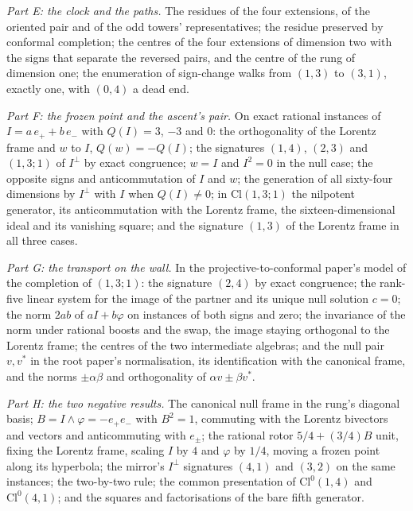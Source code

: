 \documentclass[11pt]{article}
\theoremstyle{definition}
\theoremstyle{plain}
\providecommand{\Cl}{}\renewcommand{\Cl}{\mathrm{Cl}}
\begin{document}
\emph{Part E: the clock and the paths.} The residues of the four extensions, of the oriented pair and of the odd towers' representatives; the residue preserved by conformal completion; the centres of the four extensions of dimension two with the signs that separate the reversed pairs, and the centre of the rung of dimension one; the enumeration of sign-change walks from $(1,3)$ to $(3,1)$, exactly one, with $(0,4)$ a dead end.

\emph{Part F: the frozen point and the ascent's pair.} On exact rational instances of $I = a\,e_{+} + b\,e_{-}$ with $Q(I) = 3$, $-3$ and $0$: the orthogonality of the Lorentz frame and $w$ to $I$, $Q(w) = -Q(I)$; the signatures $(1,4)$, $(2,3)$ and $(1,3;1)$ of $I^{\perp}$ by exact congruence; $w = I$ and $I^{2} = 0$ in the null case; the opposite signs and anticommutation of $I$ and $w$; the generation of all sixty-four dimensions by $I^{\perp}$ with $I$ when $Q(I) \neq 0$; in $\Cl(1,3;1)$ the nilpotent generator, its anticommutation with the Lorentz frame, the sixteen-dimensional ideal and its vanishing square; and the signature $(1,3)$ of the Lorentz frame in all three cases.

\emph{Part G: the transport on the wall.} In the projective-to-conformal paper's model of the completion of $(1,3;1)$: the signature $(2,4)$ by exact congruence; the rank-five linear system for the image of the partner and its unique null solution $c = 0$; the norm $2ab$ of $aI + b\varphi$ on instances of both signs and zero; the invariance of the norm under rational boosts and the swap, the image staying orthogonal to the Lorentz frame; the centres of the two intermediate algebras; and the null pair $v, v^{*}$ in the root paper's normalisation, its identification with the canonical frame, and the norms $\pm\alpha\beta$ and orthogonality of $\alpha v \pm \beta v^{*}$.

\emph{Part H: the two negative results.} The canonical null frame in the rung's diagonal basis; $B = I \wedge \varphi = -e_{+}e_{-}$ with $B^{2} = 1$, commuting with the Lorentz bivectors and vectors and anticommuting with $e_{\pm}$; the rational rotor $5/4 + (3/4)B$ unit, fixing the Lorentz frame, scaling $I$ by $4$ and $\varphi$ by $1/4$, moving a frozen point along its hyperbola; the mirror's $I^{\perp}$ signatures $(4,1)$ and $(3,2)$ on the same instances; the two-by-two rule; the common presentation of $\Cl^{0}(1,4)$ and $\Cl^{0}(4,1)$; and the squares and factorisations of the bare fifth generator.
\end{document}
